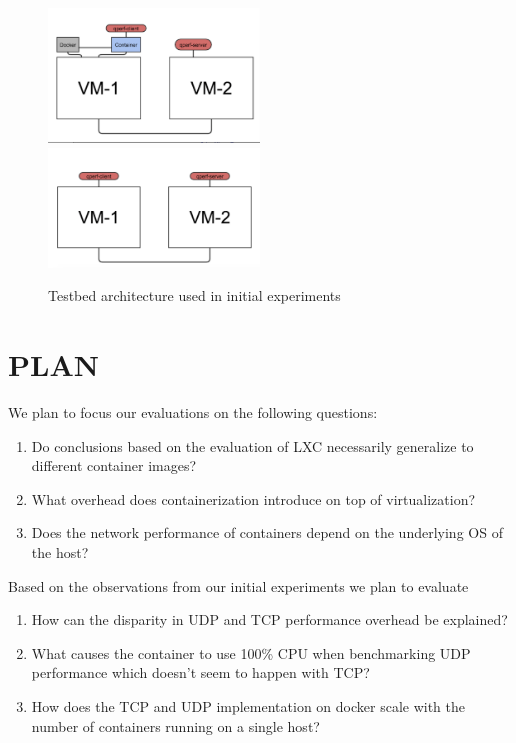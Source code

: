 \documentclass[letterpaper, 10 pt, conference]{ieeeconf}  %
\begin{document}
\begin{figure}[h]
 \centering
 \includegraphics[width=0.5\textwidth]{cont-vm.png}
\includegraphics[width=0.5\textwidth]{vm-vm.png}
\caption{Testbed architecture used in initial experiments}
\end{figure}


\section{PLAN}

We plan to focus our evaluations on the following questions:
\begin{enumerate}
	\item Do conclusions based on the evaluation of LXC \cite{zhao2017performance} necessarily generalize to different container images?
    \item What overhead does containerization introduce on top of virtualization?
    \item Does the network performance of containers depend on the underlying OS of the host?
\end{enumerate}
Based on the observations from our initial experiments we plan to evaluate 
\begin{enumerate}
	\item How can the disparity in UDP and TCP performance overhead be explained?
    \item What causes the container to use 100\% CPU when benchmarking UDP performance which doesn't seem to happen with TCP?
    \item How does the TCP and UDP implementation on docker scale with the number of containers running on a single host?
\end{enumerate}
\end{document}
